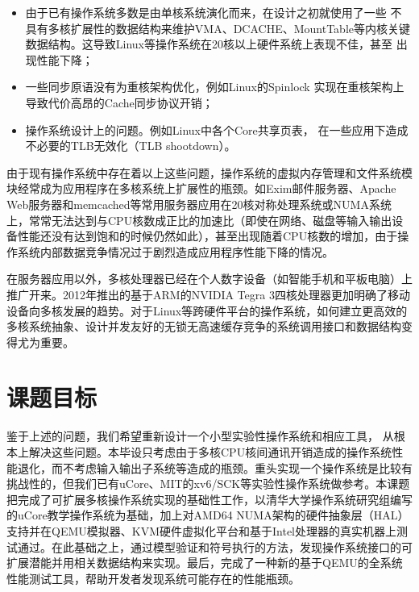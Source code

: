 	\begin{itemize}
		\item
	由于已有操作系统多数是由单核系统演化而来，在设计之初就使用了一些
	不具有多核扩展性的数据结构来维护VMA、DCACHE、MountTable等内核关键
	数据结构。这导致Linux等操作系统在20核以上硬件系统上表现不佳，甚至
	出现性能下降\cite{linux:osdi10}；
		\item 一些同步原语没有为重核架构优化，例如Linux的Spinlock
			实现在重核架构上导致代价高昂的Cache同步协议开销；
		\item
			操作系统设计上的问题。例如Linux中各个Core共享页表，
			在一些应用下造成不必要的TLB无效化（TLB shootdown）。
	\end{itemize}

由于现有操作系统中存在着以上这些问题，操作系统的虚拟内存管理和文件系统模块经常成为应用程序在多核系统上扩展性的瓶颈。如Exim邮件服务器、Apache
Web服务器和memcached等常用服务器应用在20核对称处理系统或NUMA系统上，常常无法达到与CPU核数成正比的加速比（即使在网络、磁盘等输入输出设备性能还没有达到饱和的时候仍然如此），甚至出现随着CPU核数的增加，由于操作系统内部数据竞争情况过于剧烈造成应用程序性能下降的情况\cite{linux:osdi10}。

在服务器应用以外，多核处理器已经在个人数字设备（如智能手机和平板电脑）上推广开来。2012年推出的基于ARM的NVIDIA
Tegra
3四核处理器更加明确了移动设备向多核发展的趋势。对于Linux等跨硬件平台的操作系统，如何建立更高效的多核系统抽象、设计并发友好的无锁无高速缓存竞争的系统调用接口和数据结构变得尤为重要。

\section{课题目标}

	鉴于上述的问题，我们希望重新设计一个小型实验性操作系统和相应工具，
	从根本上解决这些问题。本毕设只考虑由于多核CPU核间通讯开销造成的操作系统性能退化，而不考虑输入输出子系统等造成的瓶颈。重头实现一个操作系统是比较有挑战性的，但我们已有uCore、MIT的xv6/SCK等实验性操作系统做参考。本课题把完成了可扩展多核操作系统实现的基础性工作，以清华大学操作系统研究组编写的uCore教学操作系统为基础，加上对AMD64
	NUMA架构的硬件抽象层（HAL）支持并在QEMU模拟器、KVM硬件虚拟化平台和基于Intel处理器的真实机器上测试通过。在此基础之上，通过模型验证和符号执行的方法，发现操作系统接口的可扩展潜能并用相关数据结构来实现。最后，完成了一种新的基于QEMU的全系统性能测试工具，帮助开发者发现系统可能存在的性能瓶颈。


